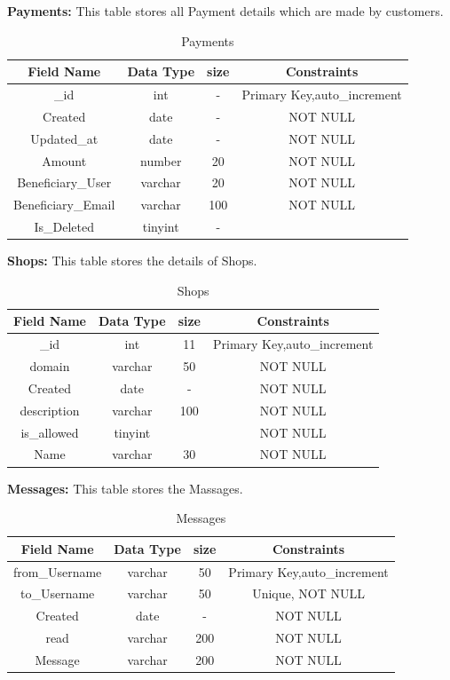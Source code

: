 \pagebreak
\textbf{Payments:}  This table stores all Payment details which are made by customers.\nolinebreak

\begin{table}[hp]
\centering
\begin{tabular}{|c|c|c|c|}
\hline
\textbf{Field Name}  & \textbf{Data Type}  & \textbf{size} &\textbf{Constraints}  \\
\hline
\_id & int &	 - & Primary Key,auto\_increment\\
\hline
Created &	date & - & NOT NULL\\
\hline
Updated\_at & date &	- & NOT NULL\\
\hline
Amount &	 number & 20 & NOT NULL\\
\hline
Beneficiary\_User & varchar & 20 & NOT NULL\\
\hline
Beneficiary\_Email & varchar & 100 & NOT NULL\\
\hline
Is\_Deleted & tinyint & - & \\
\hline
\end{tabular}
\caption{Payments}
\end{table}

\textbf{Shops:} This table stores the details of Shops.\nolinebreak
\begin{table}[hp]
\centering
\begin{tabular}{|c|c|c|c|}
\hline
\textbf{Field Name}  & \textbf{Data Type}  & \textbf{size} &\textbf{Constraints}  \\
\hline
\_id &	int	 & 11 & Primary Key,auto\_increment \\\hline
domain &	varchar & 50 & NOT NULL \\\hline
Created	 & date & - & NOT NULL \\\hline
description & varchar & 100 & NOT NULL \\\hline
is\_allowed & tinyint &  & NOT NULL \\\hline
Name & varchar &	30 & NOT NULL \\\hline
 
\end{tabular}
\caption{Shops}
\end{table}



\textbf{Messages:} This table stores the Massages.\nolinebreak
\begin{table}[hp]
\centering
\begin{tabular}{|c|c|c|c|}
\hline
\textbf{Field Name}  & \textbf{Data Type}  & \textbf{size} &\textbf{Constraints}  \\
\hline
from\_Username &	varchar &	50 &  Primary Key,auto\_increment \\\hline
to\_Username & varchar &	50 & Unique, NOT NULL \\\hline
Created  & date & - & NOT NULL \\\hline
read & varchar &	200 & NOT NULL \\\hline
Message & varchar &	200 & NOT NULL \\\hline

\end{tabular}
\caption{Messages}
\end{table}

